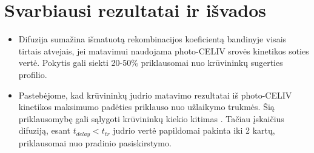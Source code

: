 \section{Svarbiausi rezultatai ir išvados}
\begin{itemize}
\item Difuzija sumažina išmatuotą rekombinacijos koeficientą bandinyje visais tirtais atvejais, jei matavimui naudojama photo-CELIV srovės kinetikos soties vertė. Pokytis gali siekti 20-50\% priklausomai nuo krūvininkų sugerties profilio.

\item Pastebėjome, kad krūvininkų judrio matavimo rezultatai iš photo-CELIV kinetikos maksimumo padėties priklauso nuo užlaikymo trukmės. Šią priklausomybę gali sąlygoti krūvininkų kiekio kitimas \cite{juška:155202}. Tačiau įskaičius difuziją, esant $t_{delay} < t_{tr}$ judrio vertė papildomai pakinta iki 2 kartų, priklausomai nuo pradinio pasiskirstymo.

\end{itemize} 
